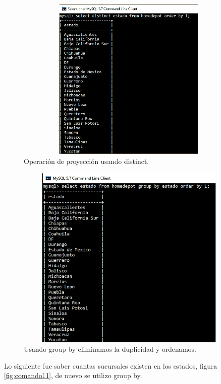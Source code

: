 \documentclass[12pt, titlepage]{article}
\begin{document}
 \begin{figure}[H]
	\begin{center}
		\includegraphics[width=12cm, height=8cm]{img/comando9.png}
		\caption{Operación de proyección usando distinct.}
		\label{fig:comando9}
	\end{center}
\end{figure}
 \begin{figure}[H]
	\begin{center}
		\includegraphics[width=12cm, height=9cm]{img/comando10.png}
		\caption{Usando group by eliminamos la duplicidad y ordenamos.}
		\label{fig:comando10}
	\end{center}
\end{figure}
Lo siguiente fue saber cuantas sucursales existen en los estados, figura \ref{fig:comando11}, de nuevo se utilizo group by.
\end{document}
